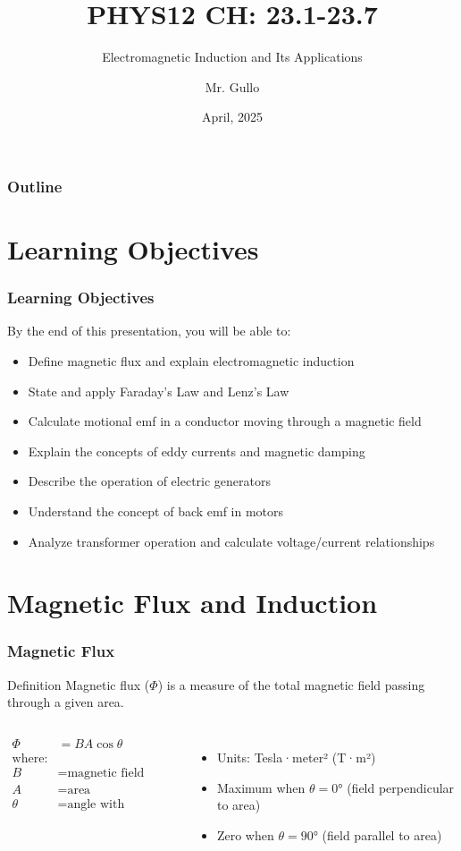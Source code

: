 \documentclass{beamer}
\title[EM Induction]{PHYS12 CH: 23.1-23.7}
\subtitle{Electromagnetic Induction and Its Applications}
\author[Mr. Gullo]{Mr. Gullo}
\date[April 2025]{April, 2025}
\begin{document}
\begin{frame}
\titlepage
\end{frame}

\begin{frame}
\frametitle{Outline}
\tableofcontents
\end{frame}

\section{Learning Objectives}

\begin{frame}
\frametitle{Learning Objectives}
By the end of this presentation, you will be able to:
\begin{itemize}
    \item Define magnetic flux and explain electromagnetic induction
    \item State and apply Faraday's Law and Lenz's Law
    \item Calculate motional emf in a conductor moving through a magnetic field
    \item Explain the concepts of eddy currents and magnetic damping
    \item Describe the operation of electric generators
    \item Understand the concept of back emf in motors
    \item Analyze transformer operation and calculate voltage/current relationships
\end{itemize}
\end{frame}

\section{Magnetic Flux and Induction}

\begin{frame}
\frametitle{Magnetic Flux}
\begin{block}{Definition}
Magnetic flux ($\Phi$) is a measure of the total magnetic field passing through a given area.
\end{block}

\begin{columns}
\begin{align}
\Phi &= BA\cos\theta \\
\text{where:} \\
B &= \text{magnetic field strength} \\
A &= \text{area} \\
\theta &= \text{angle with perpendicular}
\end{align}

\begin{itemize}
\item Units: Tesla·meter² (T·m²)
\item Maximum when $\theta = 0°$ (field perpendicular to area)
\item Zero when $\theta = 90°$ (field parallel to area)
\end{itemize}
\end{columns}


\end{frame}
\end{document}
